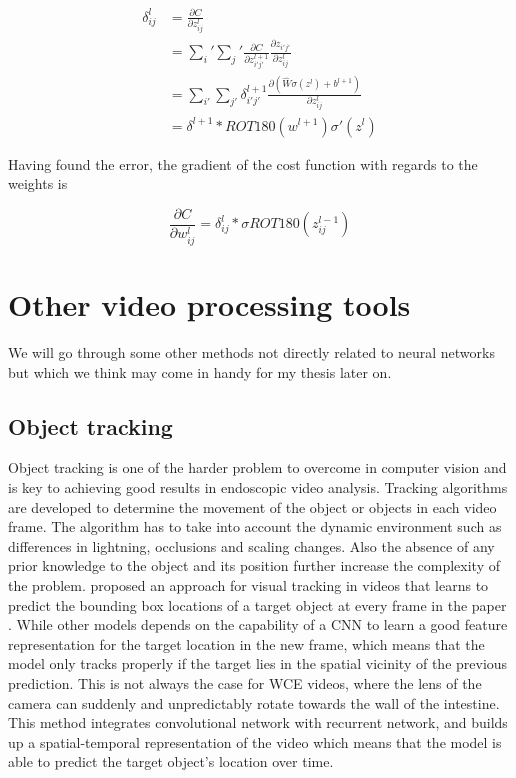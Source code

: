\documentclass[english, a4paper]{article}
\begin{document}
\begin{equation}
  \begin{aligned}
  \delta_{ij}^l &= \frac{\partial C}{\partial z_{ij}^l} \\
  &= \sum_i' \sum_j' \frac{\partial C}{\partial z_{i'j'}^{l+1}}\frac{\partial z_{i'j'}}{\partial z_{ij}^l} \\
  &= \sum_{i'} \sum_{j'}\delta_{i'j'}^{l+1} \frac{\partial (\hat{W}\sigma(z^l) + b^{l+1})}{\partial z_{ij}^l} \\
  &= \delta^{l+1} * ROT180(w^{l+1})\sigma'(z^l)
  \end{aligned}
\end{equation}

Having found the error, the gradient of the cost function with regards to the weights is

\begin{equation} %
  \frac{\partial C}{\partial w_{ij}^l} = \delta_{ij}^l * \sigma{ROT180(z_{ij}^{l-1})}
\end{equation}



\section{Other video processing tools}
We will go through some other methods not directly related to neural networks but which we think may come in handy for my thesis later on. 

\subsection{Object tracking}
Object tracking is one of the harder problem to overcome in computer vision and is key to achieving good results in endoscopic video analysis. Tracking algorithms are developed to determine the movement of the object or objects in each video frame. The algorithm has to take into account the dynamic environment such as differences in lightning, occlusions and scaling changes. Also the absence of any prior knowledge to the object and its position further increase the complexity of the problem. \citeauthor*{DeepReinforcement17} proposed an approach for visual tracking in videos that learns to predict the bounding box locations of a target object at every frame in the paper  \cite{DeepReinforcement17}. While other models depends on the capability of a CNN to learn a good feature representation for the target location in the new frame, which means that the model only tracks properly if the target lies in the spatial vicinity of the previous prediction. This is not always the case for WCE videos, where the lens of the camera can suddenly and unpredictably rotate towards the wall of the intestine. This method integrates convolutional network with recurrent network, and builds up a spatial-temporal representation of the video which means that the model is able to predict the target object's location over time.
\end{document}
